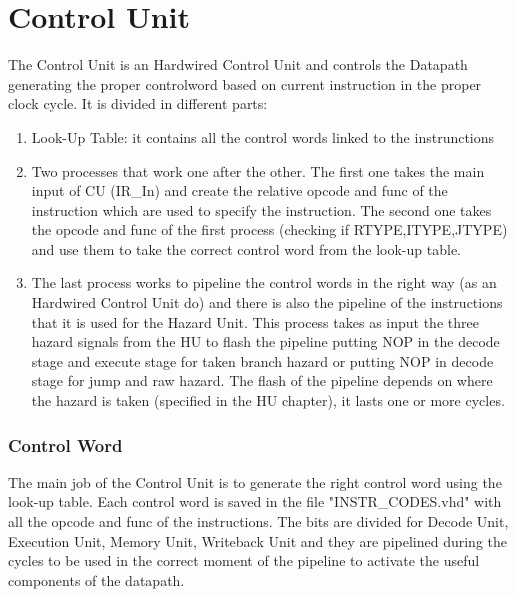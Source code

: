 \chapter{Control Unit}
\label{Control Unit}
The Control Unit is an Hardwired Control Unit and controls the Datapath generating the proper controlword based on current instruction in the proper clock cycle. It is divided in different parts:
\begin{enumerate} 
    \item Look-Up Table: it contains all the control words linked to the instrunctions
    \item Two processes that work one after the other. The first one takes the main input of CU (IR_In) and create the relative opcode and func of the instruction which are used to specify the instruction.
    The second one takes the opcode and func of the first process (checking if RTYPE,ITYPE,JTYPE) and use them to take the correct control word from the look-up table.
    \item The last process works to pipeline the control words in the right way (as an Hardwired Control Unit do) and there is also the pipeline of the instructions that it is used for the Hazard Unit.
    This process takes as input the three hazard signals from the HU to flash the pipeline putting NOP in the decode stage and execute stage for taken branch hazard or putting NOP in decode stage for jump and raw hazard.
    The flash of the pipeline depends on where the hazard is taken (specified in the HU chapter), it lasts one or more cycles. 
\end{enumerate}
\subsection{Control Word}
The main job of the Control Unit is to generate the right control word using the look-up table. Each control word is saved in the file "INSTR_CODES.vhd" with all the opcode and func of the instructions.
The bits are divided for Decode Unit, Execution Unit, Memory Unit, Writeback Unit and they are pipelined during the cycles to be used in the correct moment of the pipeline to activate the useful components of the datapath.